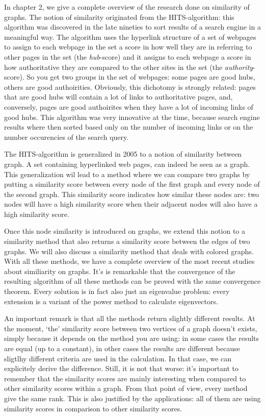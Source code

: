 \documentclass[a4paper,11pt]{report}
\begin{document}
In chapter 2, we give a complete overview of the research done on similarity of 
graphs. The notion of similarity originated from the HITS-algorithm: this 
algorithm was discovered in the late nineties to sort results of a search 
engine in a meaningful way. The algorithm uses the hyperlink structure of a set 
of webpages to assign to each webpage in the set a score in how well they are in referring to other pages
in the set (the \emph{hub}-score)  and it assigns to each webpage a score in how 
authoritative they are compared to the other sites in the set (the 
\emph{authority}-score). So you get two groups in the set of webpages: some pages are good hubs, others are good
authoirities. Obviously, this dichotomy is strongly related: pages that are good 
hubs will contain a lot of links to authoritative pages, and, conversely, pages 
are good authoirites when they have a lot of incoming links of good hubs. This 
algorithm was very innovative at the time, because search engine results where 
then sorted based only on the number of incoming links or on the number 
occurencies of the search query.

The HITS-algorithm is generalized in 2005 to a notion of similarity between 
graph. A set containing hyperlinked web pages, can indeed be seen as a graph. 
This generalization wil lead to a method where we can compare two graphs by putting a similarity score
between every node of the first graph and every node of the second graph. This similarity score 
indicates how similar these nodes are: two nodes will have a high similarity 
score when their adjacent nodes will also have a high similarity score. 

Once this node similarity is introduced on graphs, we extend this notion to a 
similarity method that also returns a similarity score between the edges of two 
graphs. We will also discuss a similarity method that deals with colored 
graphs. With all these methods, we have a complete overview of the most recent 
studies about similiarity on graphs. It's is remarkable that the convergence of 
the resulting algorithm of all these methods can be proved with the same 
convergence theorem. Every solution is in fact also just an eigenvalue problem: 
every extension is a variant of the power method to calculate eigenvectors.

An important remark is that all the methods return slightly different results. 
At the moment, `the' similarity score between two vertices of a graph doesn't 
exists, simply because it depends on the method you are using: in some cases the 
results are equal (up to a constant), in other cases the results are 
different because sligtlhy different criteria are used in the calculation. In 
that case, we can explicitely derive the difference.
Still, it is not that worse: it's important to remember that the similarity 
scores are mainly interesting when compared to other similarity scores within a graph. From that point of view,
every method give the same rank. This is also justified by the applications: all 
of them are using similarity scores in comparison to other similarity scores. 
\end{document}
